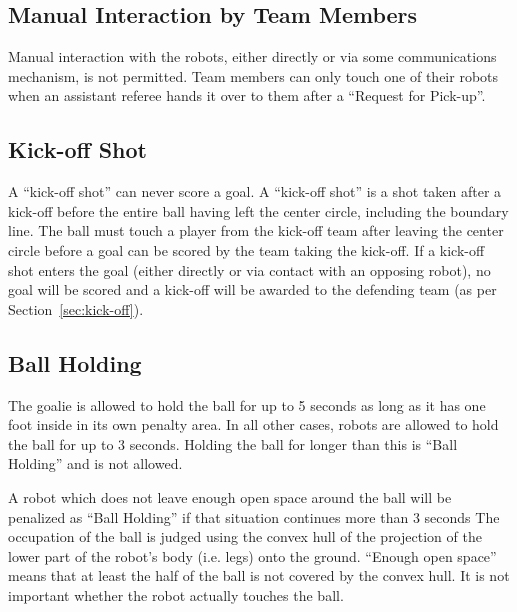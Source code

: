 \documentclass[12pt]{article}
\begin{document}
\subsection{Manual Interaction by Team Members}

Manual interaction with the robots, either directly or via some
communications mechanism, is not permitted. Team members can only
touch one of their robots when an assistant referee hands it over to
them after a ``Request for Pick-up''.

\subsection{Kick-off Shot}
\label{sec:kick-off_shot}

A ``kick-off shot'' can never score a goal.  A ``kick-off shot'' is
a shot taken after a kick-off before the entire ball having left the
center circle, including the boundary line.  The ball must touch a
player from the kick-off team after leaving the center circle before
a goal can be scored by the team taking the kick-off.  If a kick-off
shot enters the goal (either directly or via contact with an
opposing robot), no goal will be scored and a kick-off will be
awarded to the defending team (as per Section~\ref{sec:kick-off}).


\subsection{Ball Holding}
\label{sec:ball_holding}

The goalie is allowed to hold the ball for up to 5 seconds as long
as it has one foot inside in its own penalty area.  In all other
cases, robots are allowed to hold the ball for up to 3 seconds.
Holding the ball for longer than this is ``Ball Holding'' and is not
allowed.

A robot which does not leave enough open space around the ball will
be penalized as ``Ball Holding'' if that situation continues more
than 3 seconds
The occupation of the ball is judged using the convex hull of the projection of the lower part of the robot's body (i.e. legs) onto the ground. ``Enough open space'' means that at least the half of the ball is not covered by the convex hull. It is not important whether the robot actually touches the ball.
\end{document}
